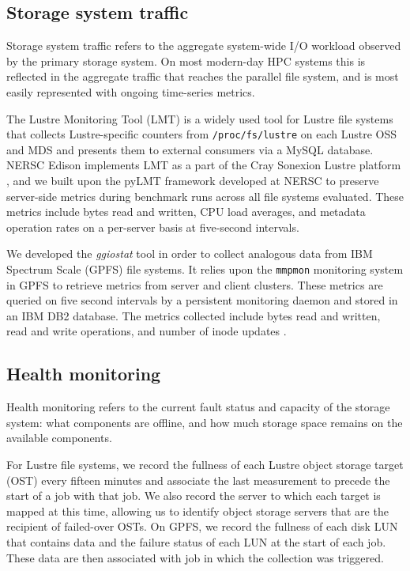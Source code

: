 \subsection{Storage system traffic}

Storage system traffic refers to the aggregate system-wide I/O workload
observed by the primary storage system.  On most modern-day HPC systems this
is reflected in the aggregate traffic that reaches the parallel file
system, and is most easily represented with ongoing time-series metrics.

\label{sec:methods/lmt}
The Lustre Monitoring Tool (LMT) is a widely used tool for Lustre file systems that collects Lustre-specific counters from \texttt{/proc/fs/lustre} on each Lustre OSS and MDS and presents them to external consumers via a MySQL database.
NERSC Edison implements LMT
as a part of the Cray Sonexion Lustre platform \cite{Keopp2014}, and we built
upon the pyLMT framework developed at NERSC \cite{Uselton2009} to preserve
server-side metrics during benchmark runs across all file systems evaluated.
These metrics include bytes read and written, CPU load averages, and metadata
operation rates on a per-server basis at five-second intervals.

\label{sec:methods/ggiostat}
We developed the \emph{ggiostat} tool in order to collect analogous data from
IBM Spectrum Scale (GPFS) file systems.    It relies upon the
\texttt{mmpmon} monitoring system in GPFS to retrieve metrics from server and
client clusters.  These metrics are queried on five second intervals by a
persistent monitoring daemon and stored in an IBM DB2 database.
The metrics collected include bytes read and written,
read and write operations, and number of inode updates .

\subsection{Health monitoring }
\label{sec:methods/health}

Health monitoring refers to the current fault status and capacity of the
storage system: what components are offline, and how much storage space
remains on the available components.

For Lustre file systems, we record the fullness of each Lustre object storage target (OST) every fifteen minutes and associate the last measurement to precede the start of a job with that job.
We also record the server to which each target is mapped at this time, allowing us to identify object storage servers that are the recipient of failed-over OSTs.
On GPFS, we record the fullness of each disk LUN that contains data and the failure status of each LUN at the start of each job.
These data are then associated with job in which the collection was triggered.

